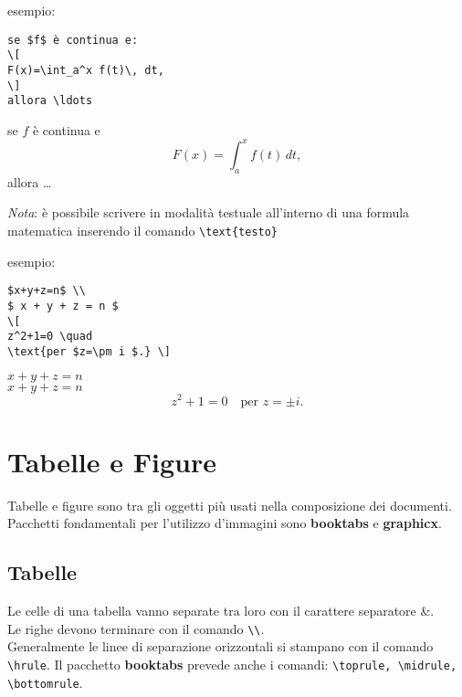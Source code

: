 \documentclass{article}
\begin{document}
                    esempio:

\begin{minipage}{\linewidth} %
\begin{multicols}{2}
\begin{lstlisting}[frame=single]
se $f$ è continua e: 
\[
F(x)=\int_a^x f(t)\, dt,
\]
allora \ldots 
\end{lstlisting}
%
\columnbreak{}
%
se $f$ è continua e 
\[
F(x)=\int_a^x f(t)\, dt,
\]
allora \ldots 
\end{multicols}
\end{minipage}

                \emph{Nota}:   è possibile scrivere in modalità testuale all'interno di una formula matematica inserendo
                        il comando \verb!\text{testo}!

                esempio:

\begin{minipage}{\linewidth}
\begin{multicols}{2}
\begin{lstlisting}[frame=single]
$x+y+z=n$ \\
$ x + y + z = n $
\[
z^2+1=0 \quad
\text{per $z=\pm i $.} \]
\end{lstlisting}
%
\columnbreak{}
%
$x+y+z=n$ \\
$ x + y + z = n $
\[
z^2+1=0 \quad
\text{per $z=\pm i $.} \]
\end{multicols}
\end{minipage}

            \section{Tabelle e Figure}
                Tabelle e figure sono tra gli oggetti più usati nella composizione dei documenti.
                Pacchetti fondamentali per l'utilizzo d'immagini sono \textbf{booktabs} e \textbf{graphicx}.
                \subsection{Tabelle}
                    Le celle di una tabella vanno separate tra loro con il carattere separatore \&. \\
                    Le righe devono terminare con il comando \verb!\\!. \\
                    Generalmente le linee di separazione orizzontali si stampano con il comando \verb!\hrule!.
                    Il pacchetto \textbf{booktabs} prevede anche i comandi: \verb!\toprule, \midrule, \bottomrule!. 
                    
\end{document}
